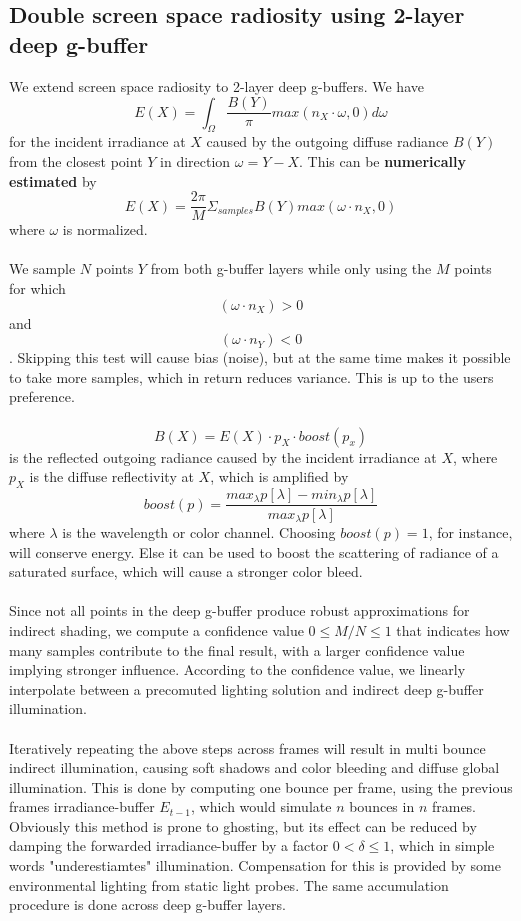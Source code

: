 \documentclass{ACGSeminar}
\begin{document}
	\subsection{Double screen space radiosity using 2-layer deep g-buffer}
		We extend screen space radiosity \cite{RTAII} to 2-layer deep g-buffers. We have 
		$$ E(X) = \int_{\Omega} \frac{B(Y)}{\pi} max(n_X \cdot \omega, 0) d\omega$$
		for the incident irradiance at $X$ caused by the outgoing diffuse radiance $B(Y)$ from the closest point $Y$ in direction $\omega = Y - X$. This can be \textbf{numerically estimated} by
		$$ E(X) = \frac{2\pi}{M} \Sigma_{samples} B(Y) max(\omega \cdot n_X, 0)$$
		where $\omega$ is normalized. \\\\
		We sample $N$ points $Y$ from both g-buffer layers while only using the $M$ points for which
		$$ (\omega \cdot n_X) > 0 $$
		and
		$$ (\omega \cdot n_Y) < 0 $$. Skipping this test will cause bias (noise), but at the same time makes it possible to take more samples, which in return reduces variance. This is up to the users preference. \\\\
		$$ B(X) = E(X) \cdot p_X \cdot boost(p_x) $$
		is the reflected outgoing radiance caused by the incident irradiance at $X$, where $p_X$ is the diffuse reflectivity at $X$, which is amplified by 
		$$ boost(p) = \frac{max_{\lambda}p[\lambda] - min_{\lambda}p[\lambda]}{max_{\lambda}p[\lambda]} $$ 
		where $\lambda$ is the wavelength or color channel. Choosing $boost(p) = 1$, for instance, will conserve energy. Else it can be used to boost the scattering of radiance of a saturated surface, which will cause a stronger color bleed. \\\\
		Since not all points in the deep g-buffer produce robust approximations for indirect shading, we compute a confidence value $0 \leq M/N \leq 1$ that indicates how many samples contribute to the final result, with a larger confidence value implying stronger influence. According to the confidence value, we linearly interpolate between a precomuted lighting solution and indirect deep g-buffer illumination. \\\\
		Iteratively repeating the above steps across frames will result in multi bounce indirect illumination, causing soft shadows and color bleeding and diffuse global illumination. This is done by computing one bounce per frame, using the previous frames irradiance-buffer $E_{t-1}$, which would simulate $n$ bounces in $n$ frames. Obviously this method is prone to ghosting, but its effect can be reduced by damping the forwarded irradiance-buffer by a factor $0 < \delta \leq 1$, which in simple words "underestiamtes" illumination. Compensation for this is provided by some environmental lighting from static light probes. The same accumulation procedure is done across deep g-buffer layers. \\\\
\end{document}
